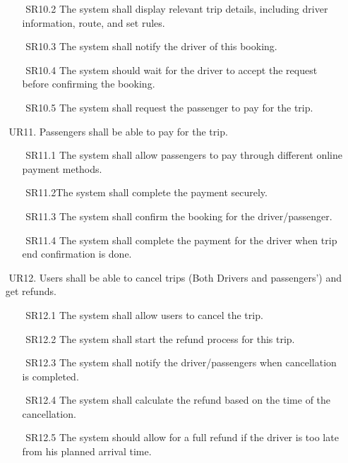 \documentclass[a4paper, 12pt]{report} %
\begin{document}
\begin{itemize}
\begin{itemize}
                    \item [$ $] SR10.2  The system shall display relevant trip details, including driver information, route, and set rules. 
                    \item [$ $] SR10.3 The system shall notify the driver of this booking.
                    \item [$ $] SR10.4 The system should wait for the driver to accept the request before confirming the booking.
                    \item [$ $] SR10.5 The system shall request the passenger to pay for the trip.
                \end{itemize}
                \item [$ $] UR11. Passengers shall be able to pay for the trip.
                \begin{itemize}
                    \item [$ $] SR11.1 The system shall allow passengers to pay through different online payment methods.
                    \item [$ $] SR11.2The system shall complete the payment securely.
                    \item [$ $] SR11.3 The system shall confirm the booking for the driver/passenger.
                    \item [$ $] SR11.4 The system shall complete the payment for the driver when trip end confirmation is done.
                \end{itemize}
                \item [$ $] UR12. Users shall be able to cancel trips (Both Drivers and passengers’) and get refunds.
                \begin{itemize}
                    \item [$ $] SR12.1 The system shall allow users to cancel the trip.
                    \item [$ $] SR12.2 The system shall start the refund process for this trip.
                    \item [$ $] SR12.3 The system shall notify the driver/passengers when cancellation is completed.
                    \item [$ $] SR12.4 The system shall calculate the refund based on the time of the cancellation.
                    \item [$ $] SR12.5 The system should allow for a full refund if the driver is too late from his planned arrival time.
                \end{itemize}

\end{itemize}
\end{document}
